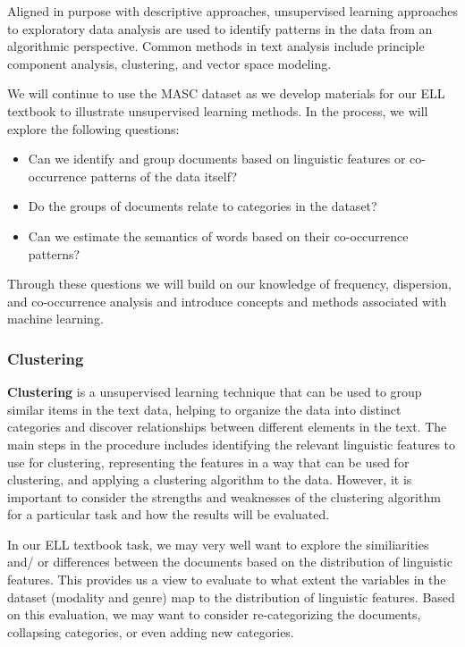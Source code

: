 \documentclass[
  letterpaper,
]{latex/krantz}
\providecommand{\tightlist}{%
  \setlength{\itemsep}{0pt}\setlength{\parskip}{0pt}}\usepackage{longtable,booktabs,array}
\theoremstyle{definition}
\theoremstyle{remark}
\begin{document}
Aligned in purpose with descriptive approaches, unsupervised learning
approaches to exploratory data analysis are used to identify patterns in
the data from an algorithmic perspective. Common methods in text
analysis include principle component analysis, clustering, and vector
space modeling.

We will continue to use the MASC dataset as we develop materials for our
ELL textbook to illustrate unsupervised learning methods. In the
process, we will explore the following questions:

\begin{itemize}
\tightlist
\item
  Can we identify and group documents based on linguistic features or
  co-occurrence patterns of the data itself?
\item
  Do the groups of documents relate to categories in the dataset?
\item
  Can we estimate the semantics of words based on their co-occurrence
  patterns?
\end{itemize}

Through these questions we will build on our knowledge of frequency,
dispersion, and co-occurrence analysis and introduce concepts and
methods associated with machine learning.

\subsubsection{Clustering}\label{sec-eda-clustering}

\textbf{Clustering} is a unsupervised learning technique that can be
used to group similar items in the text data, helping to organize the
data into distinct categories and discover relationships between
different elements in the text. The main steps in the procedure includes
identifying the relevant linguistic features to use for clustering,
representing the features in a way that can be used for clustering, and
applying a clustering algorithm to the data. However, it is important to
consider the strengths and weaknesses of the clustering algorithm for a
particular task and how the results will be evaluated.

In our ELL textbook task, we may very well want to explore the
similiarities and/ or differences between the documents based on the
distribution of linguistic features. This provides us a view to evaluate
to what extent the variables in the dataset (modality and genre) map to
the distribution of linguistic features. Based on this evaluation, we
may want to consider re-categorizing the documents, collapsing
categories, or even adding new categories.
\end{document}

